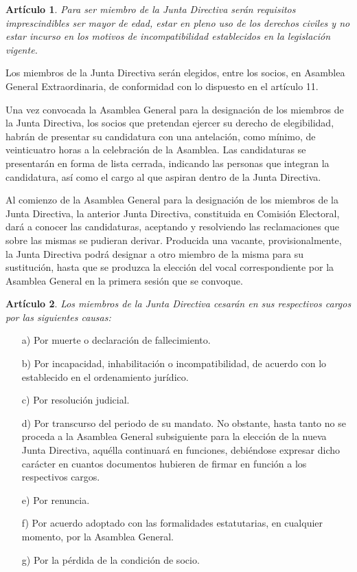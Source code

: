 \documentclass[a4paper,12pt]{article}
\theoremstyle{mystyle}		%
\newtheorem{art}{Artículo}	%
\begin{document}
\begin{onehalfspace}
\begin{art}
Para ser miembro de la Junta Directiva serán requisitos imprescindibles ser mayor de edad, estar en pleno uso de los derechos civiles y no estar incurso en los motivos de incompatibilidad establecidos en la legislación vigente.
\end{art}

Los miembros de la Junta Directiva serán elegidos, entre los socios, en Asamblea General Extraordinaria, de conformidad con lo dispuesto en el artículo 11.

Una vez convocada la Asamblea General para la designación de los miembros de la Junta Directiva, los socios que pretendan ejercer su derecho de elegibilidad, habrán de presentar su candidatura con una antelación, como mínimo, de veinticuatro horas a la celebración de la Asamblea. Las candidaturas se presentarán en forma de lista cerrada, indicando las personas que integran la candidatura, así como el cargo al que aspiran dentro de la Junta Directiva.

Al comienzo de la Asamblea General para la designación de los miembros de la Junta Directiva, la anterior Junta Directiva, constituida en Comisión Electoral, dará a conocer las candidaturas, aceptando y resolviendo las reclamaciones que sobre las mismas se pudieran derivar. Producida una vacante, provisionalmente, la Junta Directiva podrá designar a otro miembro de la misma para su sustitución, hasta que se produzca la elección del vocal correspondiente por la Asamblea General en la primera sesión que se convoque.

\begin{art}
Los miembros de la Junta Directiva cesarán en sus respectivos cargos por las siguientes causas:
\end{art}
\begin{itemize}
\item [a)] Por muerte o declaración de fallecimiento.
\item [b)] Por incapacidad, inhabilitación o incompatibilidad, de acuerdo con lo establecido en el ordenamiento jurídico.
\item [c)] Por resolución judicial.
\item [d)] Por transcurso del periodo de su mandato. No obstante, hasta tanto no se proceda a la Asamblea General subsiguiente para la elección de la nueva Junta Directiva, aquélla continuará en funciones, debiéndose expresar dicho carácter en cuantos documentos hubieren de firmar en función a los respectivos cargos.
\item [e)] Por renuncia.
\item [f)] Por acuerdo adoptado con las formalidades estatutarias, en cualquier momento, por la Asamblea General.
\item [g)] Por la pérdida de la condición de socio.
\end{itemize}


\end{onehalfspace}
\end{document}
